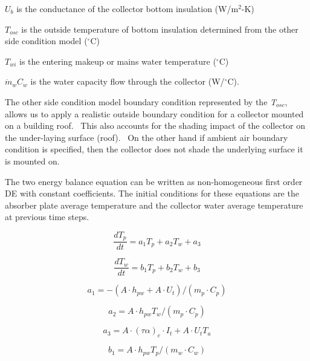 \(U_{b}\) is the conductance of the collector bottom insulation (W/m\(^{2}\)-K)

\(T_{osc}\) is the outside temperature of bottom insulation determined from the other side condition model (\(^{\circ}\)C)

\(T_{wi}\) is the entering makeup or mains water temperature (\(^{\circ}\)C)

\({\dot m_w}{C_w}\) is the water capacity flow through the collector (W/\(^{\circ}\)C).

The other side condition model boundary condition represented by the \emph{T\(_{osc}\)}, allows us to apply a realistic outside boundary condition for a collector mounted on a building roof.~ This also accounts for the shading impact of the collector on the under-laying surface (roof).~ On the other hand if ambient air boundary condition is specified, then the collector does not shade the underlying surface it is mounted on.

The two energy balance equation can be written as non-homogeneous first order DE with constant coefficients. The initial conditions for these equations are the absorber plate average temperature and the collector water average temperature at previous time steps.

\begin{equation}
\frac{{d{T_p}}}{{dt}} = {a_1}{T_p} + {a_2}{T_w} + {a_3}
\end{equation}

\begin{equation}
\frac{{d{T_w}}}{{dt}} = {b_1}{T_p} + {b_2}{T_w} + {b_3}
\end{equation}

\begin{equation}
{a_1} =  - \left( {A \cdot {h_{pw}} + A \cdot {U_t}} \right)/\left( {{m_p} \cdot {C_p}} \right)
\end{equation}

\begin{equation}
{a_2} = A \cdot {h_{pw}}{T_w}/\left( {{m_p} \cdot {C_p}} \right)
\end{equation}

\begin{equation}
{a_3} = A \cdot {\left( {\tau \alpha } \right)_e} \cdot {I_t} + A \cdot {U_t}{T_a}
\end{equation}

\begin{equation}
{b_1} = A \cdot {h_{pw}}{T_p}/\left( {{m_w} \cdot {C_w}} \right)
\end{equation}

